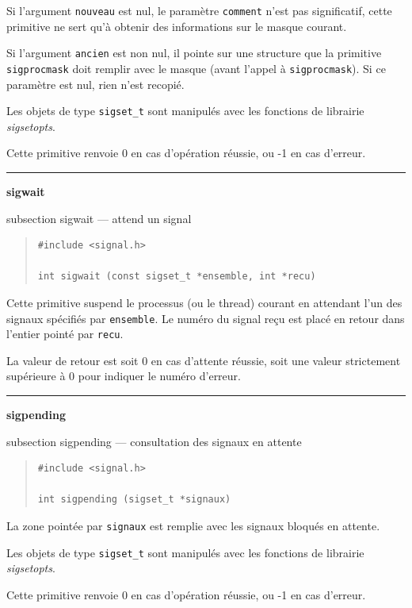 \documentclass [twoside] {report}
\newcommand {\primitive} [1]
    {
	\phantomsection
	{\large \textbf {#1}}
	\addcontentsline {toc} {subsection} {#1}
    }
\newcommand {\separation}
    {
	\vspace {5mm}
	\nopagebreak
	\hrule
    }
\begin{document}
Si l'argument \texttt {nouveau} est nul, le paramètre \texttt {comment}
n'est pas significatif, cette primitive ne sert qu'à obtenir des
informations sur le masque courant.

Si l'argument \texttt {ancien} est non nul, il pointe sur une structure que
la primitive \texttt {sigprocmask} doit remplir avec le masque (avant
l'appel à \texttt {sigprocmask}).  Si ce paramètre est nul, rien n'est
recopié.

Les objets de type \texttt {sigset\_t} sont manipulés avec les fonctions de
librairie \emph {sigsetopts}.

Cette primitive renvoie 0 en cas d'opération réussie, ou -1 en cas
d'erreur.



\separation
\primitive {sigwait} --- attend un signal
    \label {sigwait}

\begin {quote}
\begin {verbatim}
#include <signal.h>

int sigwait (const sigset_t *ensemble, int *recu)
\end{verbatim}
\end {quote}

Cette primitive suspend le processus (ou le thread) courant en attendant
l'un des signaux spécifiés par \texttt {ensemble}. Le numéro du signal
reçu est placé en retour dans l'entier pointé par \texttt {recu}.

La valeur de retour est soit 0 en cas d'attente réussie, soit une valeur
strictement supérieure à 0 pour indiquer le numéro d'erreur.


\separation
\primitive {sigpending} --- consultation des signaux en attente

\begin {quote}
\begin {verbatim}
#include <signal.h>

int sigpending (sigset_t *signaux)
\end{verbatim}
\end {quote}

La zone pointée par \texttt {signaux} est remplie avec les signaux bloqués
en attente.

Les objets de type \texttt {sigset\_t} sont manipulés avec les fonctions de
librairie \emph {sigsetopts}.

Cette primitive renvoie 0 en cas d'opération réussie, ou -1 en cas
d'erreur.
\end{document}
